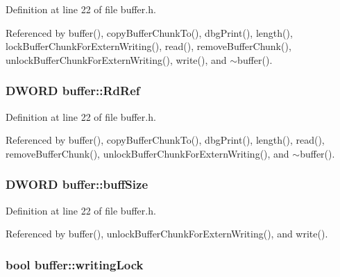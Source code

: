 Definition at line 22 of file buffer.h.



Referenced by buffer(), copyBufferChunkTo(), dbgPrint(), length(), lockBufferChunkForExternWriting(), read(), removeBufferChunk(), unlockBufferChunkForExternWriting(), write(), and $\sim$buffer().

\hypertarget{classbuffer_adc90e509cdd156719b87c39fbb3af666}{
\subsubsection[{RdRef}]{\setlength{\rightskip}{0pt plus 5cm}DWORD {\bf buffer::RdRef}}}
\label{da/d40/classbuffer_adc90e509cdd156719b87c39fbb3af666}


Definition at line 22 of file buffer.h.



Referenced by buffer(), copyBufferChunkTo(), dbgPrint(), length(), read(), removeBufferChunk(), unlockBufferChunkForExternWriting(), and $\sim$buffer().

\hypertarget{classbuffer_a9197dbc0e3e7e28442da5efb341d3616}{
\subsubsection[{buffSize}]{\setlength{\rightskip}{0pt plus 5cm}DWORD {\bf buffer::buffSize}}}
\label{da/d40/classbuffer_a9197dbc0e3e7e28442da5efb341d3616}


Definition at line 22 of file buffer.h.



Referenced by buffer(), unlockBufferChunkForExternWriting(), and write().

\hypertarget{classbuffer_ae345578999bc86d4ccda1ea66aeab11d}{
\subsubsection[{writingLock}]{\setlength{\rightskip}{0pt plus 5cm}bool {\bf buffer::writingLock}}}
\label{da/d40/classbuffer_ae345578999bc86d4ccda1ea66aeab11d}


